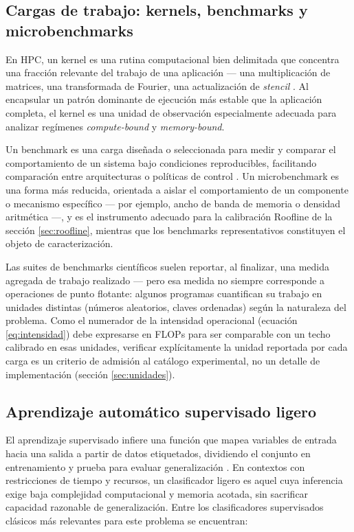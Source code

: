 \documentclass[12pt,oneside,spanish]{book}
\begin{document}
\subsection{Cargas de trabajo: kernels, benchmarks y microbenchmarks}

En HPC, un kernel es una rutina computacional bien delimitada que concentra una fracción relevante del trabajo de una aplicación --- una multiplicación de matrices, una transformada de Fourier, una actualización de \textit{stencil} \cite{SDKernel2026}. Al encapsular un patrón dominante de ejecución más estable que la aplicación completa, el kernel es una unidad de observación especialmente adecuada para analizar regímenes \textit{compute-bound} y \textit{memory-bound}.

Un benchmark es una carga diseñada o seleccionada para medir y comparar el comportamiento de un sistema bajo condiciones reproducibles, facilitando comparación entre arquitecturas o políticas de control \cite[Ch.~12]{Gregg2020}. Un microbenchmark es una forma más reducida, orientada a aislar el comportamiento de un componente o mecanismo específico --- por ejemplo, ancho de banda de memoria o densidad aritmética \cite[Ch.~12]{Gregg2020} ---, y es el instrumento adecuado para la calibración Roofline de la sección \ref{sec:roofline}, mientras que los benchmarks representativos constituyen el objeto de caracterización.

Las suites de benchmarks científicos suelen reportar, al finalizar, una medida agregada de trabajo realizado --- pero esa medida no siempre corresponde a operaciones de punto flotante: algunos programas cuantifican su trabajo en unidades distintas (números aleatorios, claves ordenadas) según la naturaleza del problema. Como el numerador de la intensidad operacional (ecuación \eqref{eq:intensidad}) debe expresarse en FLOPs para ser comparable con un techo calibrado en esas unidades, verificar explícitamente la unidad reportada por cada carga es un criterio de admisión al catálogo experimental, no un detalle de implementación (sección \ref{sec:unidades}).

\subsection{Aprendizaje automático supervisado ligero}

El aprendizaje supervisado infiere una función que mapea variables de entrada hacia una salida a partir de datos etiquetados, dividiendo el conjunto en entrenamiento y prueba para evaluar generalización \cite{Pandey2019}. En contextos con restricciones de tiempo y recursos, un clasificador ligero es aquel cuya inferencia exige baja complejidad computacional y memoria acotada, sin sacrificar capacidad razonable de generalización. Entre los clasificadores supervisados clásicos más relevantes para este problema se encuentran:
\end{document}
